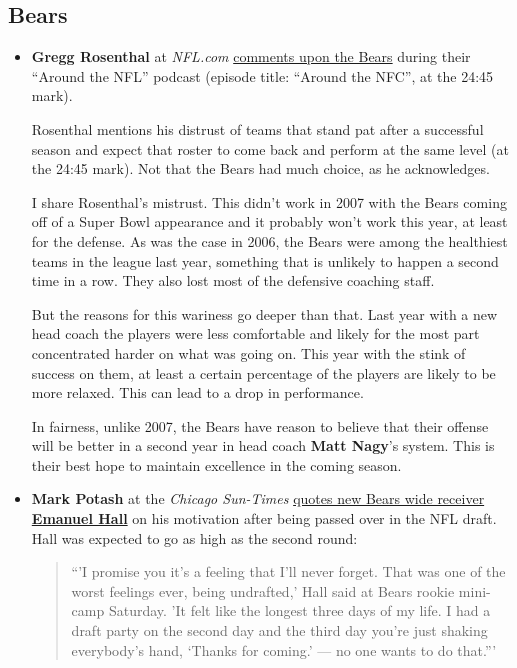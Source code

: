 \documentclass[11pt]{article}
\author{Tom Shannon}
\date{\today}
\title{}
\begin{document}
\subsection{Bears}
\begin{itemize}
\item  \textbf{Gregg Rosenthal} at \textit{NFL.com} \href{https://podcasts.apple.com/us/podcast/the-around-the-league-podcast/id680904259}{comments upon the Bears} during their ``Around the NFL'' podcast (episode title: ``Around the NFC'', at the 24:45 mark).

Rosenthal mentions his distrust of teams that stand pat after a successful season and expect that roster to come back and perform at the same level (at the 24:45 mark).  Not that the Bears had much choice, as he acknowledges.

I share Rosenthal's mistrust.  This didn't work in 2007 with the Bears coming off of a Super Bowl appearance and it probably won't work this year, at least for the defense.  As was the case in 2006, the Bears were among the healthiest teams in the league last year, something that is unlikely to happen a second time in a row.  They also lost most of the defensive coaching staff.

But the reasons for this wariness go deeper than that.  Last year with a new head coach the players were less comfortable and likely for the most part concentrated harder on what was going on.  This year with the stink of success on them, at least a certain percentage of the players are likely to be more relaxed.  This can lead to a drop in performance.

In fairness, unlike 2007, the Bears have reason to believe that their offense will be better in a second year in head coach \textbf{Matt Nagy}'s system.  This is their best hope to maintain excellence in the coming season.

\item \textbf{Mark Potash} at the \textit{Chicago Sun-Times} \href{https://chicago.suntimes.com/sports/first-and-10-bears-could-hit-the-jackpot-with-motivated-wr-emanuel-hall/}{quotes new Bears wide receiver \textbf{Emanuel Hall}} on his motivation after being passed over in the NFL draft.  Hall was expected to go as high as the second round:

\begin{quote}
  ``'I promise you it’s a feeling that I’ll never forget. That was one of the worst feelings ever, being undrafted,' Hall said at Bears rookie mini-camp Saturday. 'It felt like the longest three days of my life. I had a draft party on the second day and the third day you’re just shaking everybody’s hand, ‘Thanks for coming.’ — no one wants to do that.'''
  

\end{quote}
\end{itemize}
\end{document}
